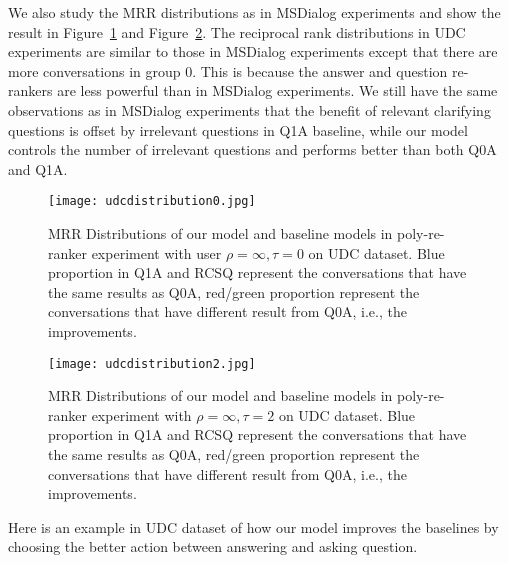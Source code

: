 \documentclass[format=acmsmall, review=False, screen=true]{acmart}
\begin{document}
We also study the MRR distributions as in MSDialog experiments and show the result in Figure~\ref{udcdistribution0} and Figure~\ref{udcdistribution2}. The reciprocal rank distributions in UDC experiments are similar to those in MSDialog experiments except that there are more conversations in group 0. This is because the answer and question re-rankers are less powerful than in MSDialog experiments. We still have the same observations as in MSDialog experiments that the benefit of relevant clarifying questions is offset by irrelevant questions in Q1A baseline, while our model controls the number of irrelevant questions and performs better than both Q0A and Q1A.

\begin{figure}[ht]
  \centering
  \texttt{[image: udcdistribution0.jpg]}
  \caption{MRR Distributions of our model and baseline models in poly-re-ranker experiment with user $\rho=\infty, \tau=0$ on UDC dataset. Blue proportion in Q1A and RCSQ represent the conversations that have the same results as Q0A, red/green proportion represent the conversations that have different result from Q0A, i.e., the improvements.}
 \label{udcdistribution0}
\end{figure}

\begin{figure}[ht]
  \centering
  \texttt{[image: udcdistribution2.jpg]}
  \caption{MRR Distributions of our model and baseline models in poly-re-ranker experiment with $\rho=\infty, \tau=2$ on UDC dataset. Blue proportion in Q1A and RCSQ represent the conversations that have the same results as Q0A, red/green proportion represent the conversations that have different result from Q0A, i.e., the improvements.}
 \label{udcdistribution2}
\end{figure}

Here is an example in UDC dataset of how our model improves the baselines by choosing the better action between answering and asking question.
\end{document}

